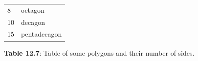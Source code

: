 {\begin{center}
\begin{xtabular*}{\mytablewidth}[t]{|p{10\mystarwidth}|p{10\mystarwidth}|}
        8 &
        octagon%
     \tabularnewline{}
        10 &
        decagon%
     \tabularnewline{}
        15 &
        pentadecagon%
     \tabularnewline{}
    \end{xtabular*}
      \end{center}
    \begin{center}{\small\bfseries Table 12.7}: Table of some polygons and their number of sides.\end{center}
        }%
    \par
    \setcounter{subfigure}{0}
